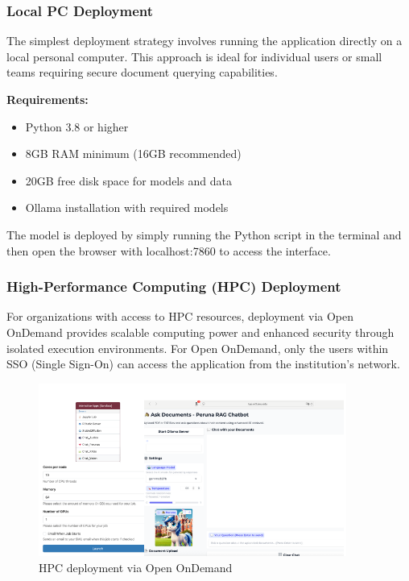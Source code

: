 \documentclass[12pt,letterpaper]{article}
\begin{document}
\subsubsection{Local PC Deployment}

The simplest deployment strategy involves running the application directly on a local personal computer. This approach is ideal for individual users or small teams requiring secure document querying capabilities.

\textbf{Requirements:}
\begin{itemize}
    \item Python 3.8 or higher
    \item 8GB RAM minimum (16GB recommended)
    \item 20GB free disk space for models and data
    \item Ollama installation with required models
\end{itemize}

The model is deployed by simply running the Python script in the terminal and then open the browser with localhost:7860 to access the interface.

\subsubsection{High-Performance Computing (HPC) Deployment}

For organizations with access to HPC resources, deployment via Open OnDemand provides scalable computing power and enhanced security through isolated execution environments.
For Open OnDemand, only the users within SSO (Single Sign-On) can access the application from the institution's network.

\begin{figure}[H]
    \centering
    \includegraphics[width=0.9\textwidth]{plots/HPC.png}
    \caption{HPC deployment via Open OnDemand}
    \label{fig:OOD}
\end{figure}
\end{document}
